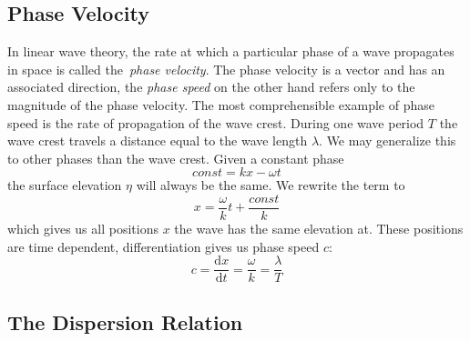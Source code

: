 \subsection{Phase Velocity}
\label{sec:phase_velocity}
In linear wave theory, the rate at which a particular phase of a wave propagates in space is called
the~\emph{phase velocity}. The phase velocity is a vector and has an associated direction,
the \emph{phase speed} on the other hand refers only to the magnitude of the phase velocity.
The most comprehensible example of phase speed is the rate of propagation of the wave crest.
During one wave period $T$ the wave crest travels a distance equal to the wave length $\lambda$.
We may generalize this to other phases than the wave crest. Given a constant phase
\begin{equation*}
  const = kx - \omega t
\end{equation*}
the surface elevation $\eta$ will always be the same. We rewrite the term to
\begin{equation*}
  x = \frac{\omega}{k}t + \frac{const}{k}
\end{equation*}
which gives us all positions $x$ the wave has the same elevation at. These positions are time dependent,
differentiation gives us phase speed $c$:
\begin{equation*}
  c = \frac{\mathrm dx}{\mathrm dt} = \frac{\omega}{k} = \frac{\lambda}{T}
\end{equation*}

\subsection{The Dispersion Relation}
\label{sec:dispersion_relation}

